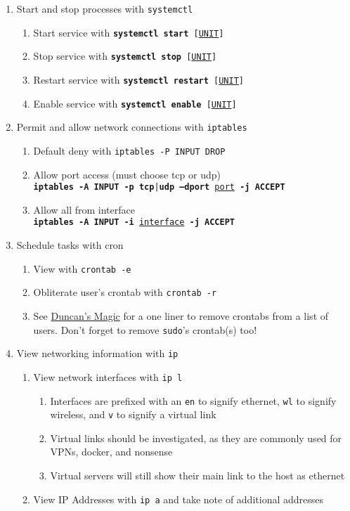 \documentclass[12pt,letterpaper]{article}
\def\code#1{\textcolor{iris}{\texttt{#1}}}
\def\bf#1{\textbf{#1}}
\def\ul#1{\underline{#1}}
\begin{document}
\begin{enumerate}
	\item Start and stop processes with \code{systemctl}
		\begin{enumerate}
			\item Start service with \code{\bf{systemctl start} [\ul{UNIT}]}
			\item Stop service with \code{\bf{systemctl stop} [\ul{UNIT}]}
			\item Restart service with \code{\bf{systemctl restart} [\ul{UNIT}]}
			\item Enable service with \code{\bf{systemctl enable} [\ul{UNIT}]}
		\end{enumerate}
	\item Permit and allow network connections with \code{iptables}
		\begin{enumerate}
			\item Default deny with \code{iptables -P INPUT DROP}
			\item Allow port access (must choose tcp or udp) \\
				\code{\bf{iptables -A INPUT -p tcp}|\bf{udp --dport} \ul{port} \bf{-j ACCEPT}}
			\item Allow all from interface \\
				\code{\bf{iptables -A INPUT -i} \ul{interface} \bf{-j ACCEPT}}
		\end{enumerate}
	\item Schedule tasks with cron
		\begin{enumerate}
			\item View with \code{crontab -e}
			\item Obliterate user's crontab with \code{crontab -r}
			\item See \hyperref[subsec:dmagic]{Duncan's Magic} for a one liner to remove crontabs from a list of users. Don't forget to remove \code{sudo}'s crontab(s) too!
		\end{enumerate}
	\item View networking information with \code{ip}
		\begin{enumerate}
			\item View network interfaces with \code{ip l}
				\begin{enumerate}
					\item Interfaces are prefixed with an \code{en} to signify ethernet, \code{wl} to signify wireless, and \code{v} to signify a virtual link
					\item Virtual links should be investigated, as they are commonly used for VPNs, docker, and nonsense
					\item Virtual servers will still show their main link to the host as ethernet
				\end{enumerate}
			\item View IP Addresses with \code{ip a} and take note of additional addresses
		\end{enumerate}
\end{enumerate}
\end{document}

